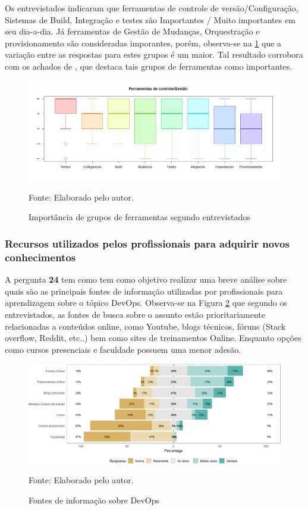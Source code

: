 \documentclass[twoside,english,brazilian]{UNISINOSartigo}
\newcommand{\source}[1]{\caption*{Fonte: {#1}} }
\begin{document}
Os entrevistados indicaram que ferramentas de controle de versão/Configuração, Sistemas de Build, Integração e testes são Importantes / Muito importantes em seu dia-a-dia. Já ferramentas de Gestão de Mudanças, Orquestração e provisionamento são consideradas imporantes, porém, observa-se na \ref{fig:importFerramentas} que a variação entre as respostas para estes grupos é um maior. 
Tal resultado corrobora com os achados de , que destaca tais grupos de ferramentas como importantes.

\begin{figure}[H]
    \centering
    \caption{Importância de grupos de ferramentas segundo entrevistados}
       \includegraphics[scale=.5]{imagens/Rplot05.png}
        \source{Elaborado pelo autor.}
    \label{fig:importFerramentas}
\end{figure}

\subsubsection{Recursos  utilizados pelos profissionais para adquirir novos conhecimentos}
A pergunta \textbf{24} tem como tem como objetivo realizar uma breve análise sobre quais são as principais fontes de informação utilizadas por profissionais para aprendizagem sobre o tópico DevOps. Observa-se na Figura \ref{fig:fontesConhecimento} que segundo os entrevistados, as fontes de busca sobre o assunto estão prioritariamente relacionadas a conteúdos online, como Youtube, blogs técnicos, fóruns (Stack overflow,  Reddit, etc..) bem como sites de treinamentos Online. Enquanto opções como cursos presenciais e faculdade possuem uma menor adesão.

\begin{figure}[H]
    \centering
    \caption{Fontes de informação sobre DevOps}
       \includegraphics[scale=.5]{imagens/questao24.png}
       \source{Elaborado pelo autor.}
    \label{fig:fontesConhecimento}
\end{figure}
\end{document}
